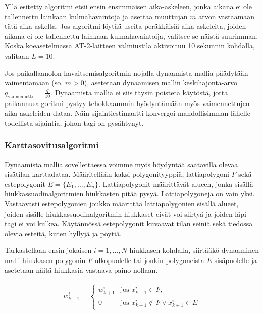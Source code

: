 \documentclass[
  12pt,
  a4paper, twoside]{book}
\begin{document}
Yllä esitetty algoritmi etsii ensin ensimmäisen aika-askeleen, jonka aikana ei ole tallennettu lainkaan kulmahavaintoja ja asettaa muuttujan \(m\) arvon vastaamaan tätä aika-askelta. Jos algoritmi löytää useita peräkkäisiä aika-askeleita, joiden aikana ei ole tallennettu lainkaan kulmahavaintoija, valitsee se näistä suurimman. Koska koeasetelmassa AT-2-laitteen valmiustila aktivoituu 10 sekunnin kohdalla, valitaan \(L=10\).

Jos paikallaanolon havaitsemisalgoritmin nojalla dynaamista mallia päädytään vaimentamaan (so. \(m>0\)), asetetaan dynaamisen mallin keskihajonta-arvo \(q_{\text{vaimennettu}}=\frac{q}{10}\). Dynaamista mallia ei siis täysin poisteta käytöstä, jotta paikannusalgoritmi pystyy tehokkaammin hyödyntämään myös vaimennettujen aika-askeleiden dataa. Näin sijaintiestimaatti konvergoi mahdollisimman lähelle todellista sijaintia, johon tagi on pysähtynyt.

\hypertarget{karttasovitusalgoritmi}{%
\subsubsection{Karttasovitusalgoritmi}\label{karttasovitusalgoritmi}}

Dynaamista mallia sovellettaessa voimme myös höydyntää saatavilla olevaa sisätilan karttadataa. Määritellään kaksi polygonityyppiä, lattiapolygoni \(F\) sekä estepolygonit \(E=\{E_1,\ldots,E_n\}\). Lattiapolygonit määrittävät alueen, jonka sisällä hiukkassuodinalgoritmien hiukkasten pitää pysyä. Lattiapolygoneja on vain yksi. Vastaavasti estepolygonien joukko määrittää lattiapolygonien sisällä alueet, joiden sisälle hiukkassuodinalgoritmin hiukkaset eivät voi siirtyä ja joiden läpi tagi ei voi kulkea. Käytännössä estepolygonit kuvaavat tilan seiniä sekä tiedossa olevia esteitä, kuten hyllyjä ja pöytiä.

Tarkastellaan ensin jokaisen \(i=1,\ldots,N\) hiukkasen kohdalla, siirtääkö dynaaminen malli hiukkasen polygonin \(F\) ulkopuolelle tai jonkin polygoneista \(E\) sisäpuolelle ja asetetaan näitä hiukkasia vastaava paino nollaan.

\begin{align}\label{inclusion-polygon}
\displaystyle w^i_{k+1}={\begin{cases}w^i_{k+1}&\text{jos } x^i_{k+1} \in F,\\
0& \text{jos } x^i_{k+1} \notin F \lor x^i_{k+1} \in E \end{cases}}\end{align}
\end{document}
